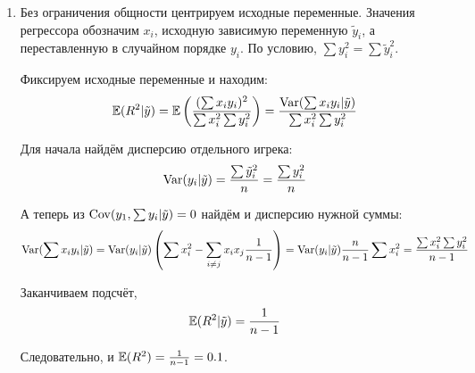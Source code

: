 \begin{enumerate}
\item Без ограничения общности центрируем исходные переменные.
Значения регрессора обозначим $x_i$, исходную зависимую переменную $\tilde{y}_i$,
а переставленную в случайном порядке $y_i$.
По условию, $\sum y_i^2 = \sum \tilde{y}_i^2$.

Фиксируем исходные переменные и находим:
\[
\mathbb{E}(R^2 | \tilde{y}) = \mathbb{E}\left( \frac{(\sum x_i y_i )^2}{\sum x_i^2 \sum y_i^2}  \right) = \frac{\operatorname{Var}(\sum x_i y_i | \tilde{y})}{\sum x_i^2 \sum y_i^2}
\]

Для начала найдём дисперсию отдельного игрека:
\[
\operatorname{Var}(y_i | \tilde{y}) = \frac{\sum \tilde{y}_i^2}{n} = \frac{\sum y_i^2}{n}
\]

А теперь из $\operatorname{Cov}(y_1, \sum y_i | \tilde{y}) =0$ найдём и дисперсию нужной суммы:
\[
\operatorname{Var}(\sum x_i y_i | \tilde{y}) = \operatorname{Var}(y_i | \tilde{y}) \left(  \sum x_i^2 - \sum_{i\neq j} x_i x_j \frac{1}{n-1}  \right) = \operatorname{Var}(y_i | \tilde{y}) \frac{n}{n-1} \sum x_i^2 = \frac{\sum x_i^2 \sum y_i^2 }{n-1}
\]

Заканчиваем подсчёт,
\[
\mathbb{E}(R^2 | \tilde{y}) = \frac{1}{n-1}
\]

Следовательно, и $\mathbb{E}(R^2) = \frac{1}{n-1} = 0.1$.

\end{enumerate}
